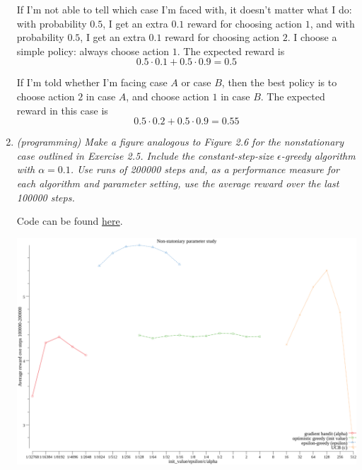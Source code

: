 \documentclass[12pt,a4paper]{article}
\begin{document}
\begin{enumerate}
  If I'm not able to tell which case I'm faced with, it doesn't matter what I do:
  with probability $0.5$, I get an extra $0.1$ reward for choosing action $1$,
  and with probability $0.5$, I get an extra $0.1$ reward for choosing action $2$.
  I choose a simple policy: always choose action $1$. The expected reward is
  \[
  0.5 \cdot 0.1 + 0.5 \cdot 0.9 = 0.5
  \]

  If I'm told whether I'm facing case $A$ or case $B$, then the best policy is to choose
  action $2$ in case $A$, and choose action $1$ in case $B$. The expected reward in this
  case is
  \[0.5 \cdot 0.2 + 0.5 \cdot 0.9 = 0.55\]

\item
  \textit{(programming) Make a figure analogous to Figure 2.6 for the nonstationary
case outlined in Exercise 2.5. Include the constant-step-size $\epsilon$-greedy algorithm with
$\alpha = 0.1$. Use runs of 200000 steps and, as a performance measure for each algorithm and
parameter setting, use the average reward over the last 100000 steps.}

Code can be found \href{https://github.com/hannagabor/SBRL/tree/master/2.11/go/src/main}{here}.

\begin{center}
  \includegraphics[scale=0.3]{parameter_study}
\end{center}

\end{enumerate}
\end{document}
